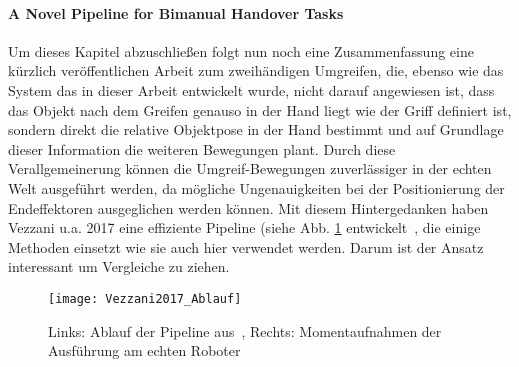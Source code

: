 \paragraph{A Novel Pipeline for Bimanual Handover Tasks}

Um dieses Kapitel abzuschließen folgt nun noch eine Zusammenfassung eine kürzlich veröffentlichen Arbeit zum zweihändigen Umgreifen, die, ebenso wie das System das in dieser Arbeit entwickelt wurde, nicht darauf angewiesen ist, dass das Objekt nach dem Greifen genauso in der Hand liegt wie der Griff definiert ist, sondern direkt die relative Objektpose in der Hand bestimmt und auf Grundlage dieser Information die weiteren Bewegungen plant. Durch diese Verallgemeinerung können die Umgreif-Bewegungen zuverlässiger in der echten Welt ausgeführt werden, da mögliche Ungenauigkeiten bei der Positionierung der Endeffektoren ausgeglichen werden können. Mit diesem Hintergedanken haben Vezzani u.a. 2017 eine effiziente Pipeline (siehe Abb. \ref{fig:Vezzani_Highlevel} entwickelt~\citep{vezzani2017novel}, die einige Methoden einsetzt wie sie auch hier verwendet werden. Darum ist der Ansatz interessant um Vergleiche zu ziehen.

\begin{figure}[h]
\begin{center}
\texttt{[image: Vezzani2017\_Ablauf]}
\caption{Links: Ablauf der Pipeline aus~\cite{vezzani2017novel}, Rechts: Momentaufnahmen der Ausführung am echten Roboter~\citep{metta2010icub}}
\label{fig:Vezzani_Highlevel}
\end{center}
\end{figure}

